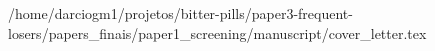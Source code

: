 /home/darciogm1/projetos/bitter-pills/paper3-frequent-losers/papers_finais/paper1_screening/manuscript/cover_letter.tex